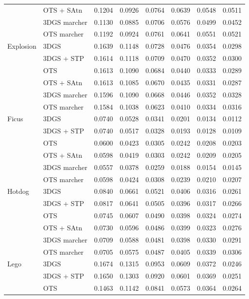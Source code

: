 \begin{longtable}[H]{llrrrrrr}
 & OTS + SAtn & 0.1204 & 0.0926 & 0.0764 & 0.0639 & 0.0548 & 0.0511 \\
 & 3DGS marcher & 0.1130 & 0.0885 & 0.0706 & 0.0576 & 0.0499 & 0.0452 \\
 & OTS marcher & 0.1192 & 0.0924 & 0.0761 & 0.0641 & 0.0551 & 0.0521 \\
Explosion & 3DGS & 0.1639 & 0.1148 & 0.0728 & 0.0476 & 0.0354 & 0.0298 \\
 & 3DGS + STP & 0.1614 & 0.1118 & 0.0709 & 0.0470 & 0.0352 & 0.0300 \\
 & OTS & 0.1613 & 0.1090 & 0.0684 & 0.0440 & 0.0333 & 0.0289 \\
 & OTS + SAtn & 0.1613 & 0.1085 & 0.0670 & 0.0435 & 0.0331 & 0.0287 \\
 & 3DGS marcher & 0.1596 & 0.1090 & 0.0668 & 0.0446 & 0.0352 & 0.0328 \\
 & OTS marcher & 0.1584 & 0.1038 & 0.0623 & 0.0410 & 0.0334 & 0.0316 \\
Ficus & 3DGS & 0.0740 & 0.0528 & 0.0341 & 0.0201 & 0.0134 & 0.0112 \\
 & 3DGS + STP & 0.0740 & 0.0517 & 0.0328 & 0.0193 & 0.0128 & 0.0109 \\
 & OTS & 0.0600 & 0.0423 & 0.0305 & 0.0242 & 0.0208 & 0.0203 \\
 & OTS + SAtn & 0.0598 & 0.0419 & 0.0303 & 0.0242 & 0.0209 & 0.0205 \\
 & 3DGS marcher & 0.0557 & 0.0378 & 0.0259 & 0.0188 & 0.0154 & 0.0145 \\
 & OTS marcher & 0.0598 & 0.0424 & 0.0308 & 0.0239 & 0.0210 & 0.0207 \\
Hotdog & 3DGS & 0.0840 & 0.0661 & 0.0521 & 0.0406 & 0.0316 & 0.0261 \\
 & 3DGS + STP & 0.0817 & 0.0641 & 0.0505 & 0.0396 & 0.0317 & 0.0266 \\
 & OTS & 0.0745 & 0.0607 & 0.0490 & 0.0398 & 0.0324 & 0.0274 \\
 & OTS + SAtn & 0.0730 & 0.0596 & 0.0486 & 0.0399 & 0.0323 & 0.0276 \\
 & 3DGS marcher & 0.0709 & 0.0588 & 0.0481 & 0.0398 & 0.0330 & 0.0291 \\
 & OTS marcher & 0.0705 & 0.0575 & 0.0487 & 0.0405 & 0.0339 & 0.0306 \\
Lego & 3DGS & 0.1674 & 0.1315 & 0.0953 & 0.0609 & 0.0372 & 0.0246 \\
 & 3DGS + STP & 0.1650 & 0.1303 & 0.0920 & 0.0601 & 0.0369 & 0.0251 \\
 & OTS & 0.1463 & 0.1142 & 0.0841 & 0.0573 & 0.0364 & 0.0264 \\

\end{longtable}
